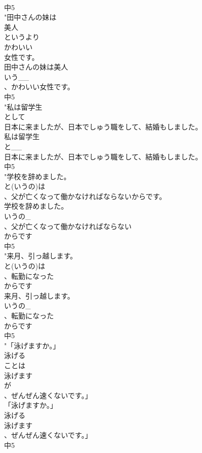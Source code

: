 \documentclass[8pt]{extreport}
\begin{document}
\begin{CJK}{UTF8}{min}
\\	中5
\\	"田中さんの妹は
\\	美人
\\	というより
\\	かわいい
\\	女性です。
\\	田中さんの妹は美人
\\	いう__
\\	、かわいい女性です。
\\	中5
\\	"私は留学生
\\	として
\\	日本に来ましたが、日本でしゅう職をして、結婚もしました。
\\	私は留学生
\\	と__
\\	日本に来ましたが、日本でしゅう職をして、結婚もしました。
\\	中5
\\	"学校を辞めました。
\\	と(いうの)は
\\	、父が亡くなって働かなければならないからです。
\\	学校を辞めました。
\\	いうの_
\\	、父が亡くなって働かなければならない
\\	からです
\\	中5
\\	"来月、引っ越します。
\\	と(いうの)は
\\	、転勤になった
\\	からです
\\	来月、引っ越します。
\\	いうの_
\\	、転勤になった
\\	からです
\\	中5
\\	"「泳げますか。」
\\	泳げる
\\	ことは
\\	泳げます
\\	が
\\	、ぜんぜん速くないです。」
\\	「泳げますか。」
\\	泳げる
\\	泳げます
\\	、ぜんぜん速くないです。」
\\	中5

\end{CJK}
\end{document}
